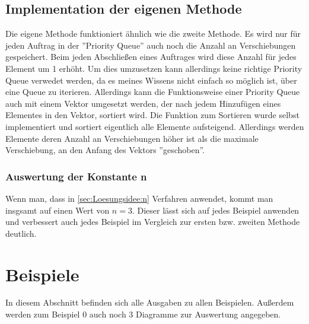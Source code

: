 \documentclass[a4paper,10pt,ngerman]{scrartcl}
\begin{document}
    \subsection{Implementation der eigenen Methode}
      Die eigene Methode funktioniert ähnlich wie die zweite Methode. Es wird nur für jeden Auftrag in der ''Priority Queue'' auch noch die Anzahl an Verschiebungen gespeichert. Beim jeden Abschließen eines Auftrages wird diese Anzahl für jedes Element um 1 erhöht. Um dies umzusetzen kann allerdings keine richtige Priority Queue verwedet werden, da es meines Wissens nicht einfach so möglich ist, über eine Queue zu iterieren. Allerdings kann die Funktionsweise einer Priority Queue auch mit einem Vektor umgesetzt werden, der nach jedem Hinzufügen eines Elementes in den Vektor, sortiert wird. Die Funktion zum Sortieren wurde selbst implementiert und sortiert eigentlich alle Elemente aufsteigend. Allerdings werden Elemente deren Anzahl an Verschiebungen höher ist als die maximale Verschiebung, an den Anfang des Vektors ''geschoben''.
      \subsubsection{Auswertung der Konstante n\label{sec:Umsetzung:Eigene:Auswertung}}
        Wenn man, dass in \cref{sec:Loesungsidee:n} Verfahren anwendet, kommt man insgsamt auf einen Wert von $n=3$. Dieser lässt sich auf jedes Beispiel anwenden und verbessert auch jedes Beispiel im Vergleich zur ersten bzw. zweiten Methode deutlich.
        
  \section{Beispiele}
    In diesem Abschnitt befinden sich alle Ausgaben zu allen Beispielen. Außerdem werden zum Beispiel 0 auch noch 3 Diagramme zur Auswertung angegeben.
\end{document}
